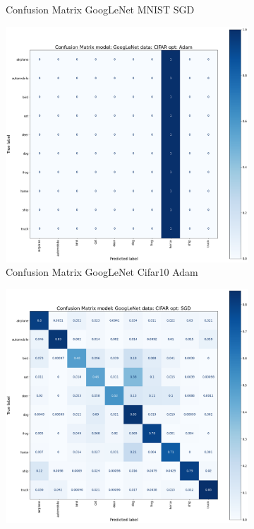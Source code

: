 \documentclass[conference]{IEEEtran}
\begin{document}
\begin{figure}[!htbp]
\begin{subfigure}[b]{0.22\textwidth}
        \caption{Confusion Matrix GoogLeNet MNIST SGD}
        \label{fig:x matrix_GoogLeNet_MNIST_SGD}
    \end{subfigure}
    \begin{subfigure}[b]{0.22\textwidth}
        \centering
        \includegraphics[width=\textwidth]{img/matrix_GoogLeNet_CIFAR_adam.png}
        \caption{Confusion Matrix GoogLeNet Cifar10 Adam}
        \label{fig:x matrix_GoogLeNet_CIFAR_Adam}
    \end{subfigure}
    \hfill
    \begin{subfigure}[b]{0.22\textwidth}
        \centering
        \includegraphics[width=\textwidth]{img/matrix_GoogLeNet_CIFAR_SGD.png}

\end{subfigure}
\end{figure}
\end{document}
